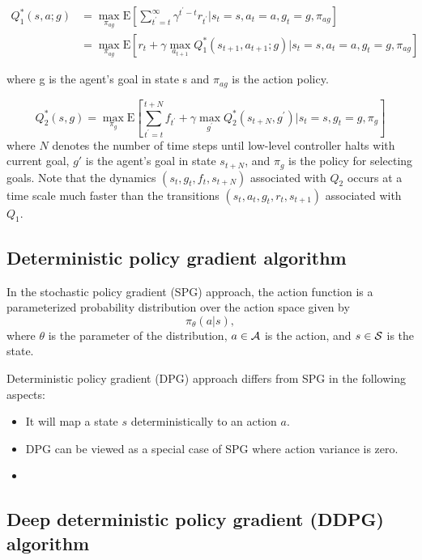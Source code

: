 \begin{refsection}
\begin{remark}\cite{kulkarni2016hierarchical}
	
\end{remark}


\begin{align*}
Q_{1}^{*}(s, a ; g)&=\max _{\pi_{a g}} \mathrm{E}\left[\sum_{t^{\prime}=t}^{\infty} \gamma^{t^{\prime}-t} r_{t^{\prime}} | s_{t}=s, a_{t}=a, g_{t}=g, \pi_{a g}\right] \\
&=\max _{\pi_{a g}} \mathrm{E}\left[r_{t}+\gamma \max _{a_{t+1}} Q_{1}^{*}\left(s_{t+1}, a_{t+1} ; g\right) | s_{t}=s, a_{t}=a, g_{t}=g, \pi_{a g}\right]
\end{align*}

where g is the agent's goal in state s and $\pi_{ag}$ is the action policy.

$$Q_{2}^{*}(s, g)=\max _{\pi_{g}} \mathrm{E}\left[\sum_{t^{\prime}=t}^{t+N} f_{t^{\prime}}+\gamma \max _{g^{\prime}} Q_{2}^{*}\left(s_{t+N}, g^{\prime}\right) | s_{t}=s, g_{t}=g, \pi_{g}\right]$$
where $N$ denotes the number of time steps until low-level controller halts with current goal, $g'$ is the agent's goal in state $s_{t+N}$, and $\pi_g$ is the policy for selecting goals. Note that the dynamics $(s_t, g_t, f_t, s_{t+N})$ associated with $Q_2$ occurs at a time scale much faster than the transitions $(s_t, a_t, g_t, r_t, s_{t+1})$ associated with $Q_1$.


\subsection{Deterministic policy gradient algorithm}
\cite{silver2014deterministic}


In the stochastic policy gradient (SPG) approach, the action function is a parameterized probability distribution over the action space given by
$$\pi_{\theta}(a|s),$$
where $\theta$ is the parameter of the distribution, $a\in \mathcal{A}$ is the action, and $s\in \mathcal{S}$ is the state.

Deterministic policy gradient (DPG) approach differs from SPG in the following aspects:
\begin{itemize}
	\item It will map a state $s$ deterministically to an action $a$.
	\item DPG can be viewed as a special case of SPG where action variance is zero.
	\item 
\end{itemize}


\subsection{Deep deterministic policy gradient (DDPG) algorithm}


\end{refsection}
